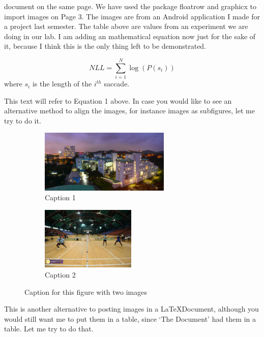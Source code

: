 \documentclass[a4paper,12pt]{extarticle}
\begin{document}
document on the same page. We have used the package floatrow and
graphicx to import images on Page 3. The images are from an Android
application I made for a project last semester. The table above are
values from an experiment we are doing in our lab. I am adding an
mathematical equation now just for the sake of it, because I think this is the only thing left to be demonstrated.\par
\begin{equation}
{NLL} = \sum_{i=1}^{N} \log{(P(s_{i}))} 
\end{equation}
where $s_{i}$  is the length of the $i^{th}$ saccade. \par
This text will refer to Equation 1 above. In case you would like to
see an alternative method to align the images, for instance images as subfigures, let me try to do it.\par
\newpage
\vspace*{0.5cm}
\begin{figure}
\centering
\begin{subfigure}{.5\textwidth}
  \centering
  \includegraphics[height=3cm, width=.7\linewidth,]{img1.jpg}
  \caption{Caption 1}
  \label{fig:04}
\end{subfigure}%
\hspace{-1.4cm}
\begin{subfigure}{.5\textwidth}
  \centering
  \includegraphics[height=3cm ,width=.7\linewidth,  ]{img2.jpg}
  \caption{Caption 2}
  \label{fig:05}
\end{subfigure}
\caption{Caption for this figure with two images}
\label{fig:test}
\end{figure}
\vspace{-1cm}
 This is another alternative to posting images in a \LaTeX Document, although you would still want me to put them in a table, since ‘The Document’ had them in a table. Let me try to do that.\\
\end{document}
